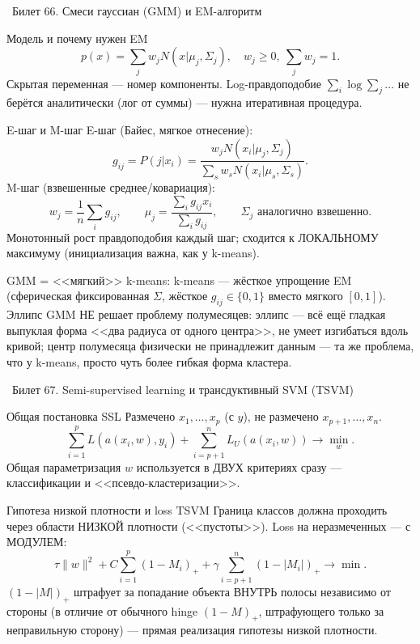 \documentclass[12pt, a4paper]{article}
\newcommand{\bilet}[2]{%
  \vspace{10pt}%
  \noindent\colorbox{qcolor}{\parbox{\dimexpr\linewidth-2\fboxsep\relax}{%
    \color{white}\large\bfseries\strut\ Билет #1. #2%
  }}%
  \nopagebreak\vspace{5pt}\par\nopagebreak%
}
\begin{document}
\bilet{66}{Смеси гауссиан (GMM) и EM-алгоритм}

\begin{defbox}{Модель и почему нужен EM}
\[
  p(x) = \sum_j w_j N(x|\mu_j,\Sigma_j), \quad w_j\ge0,\ \sum_j w_j=1.
\]
Скрытая переменная --- номер компоненты. Log-правдоподобие $\sum_i\log\sum_j\ldots$ не берётся аналитически (лог от суммы) --- нужна итеративная процедура.
\end{defbox}

\begin{proofbox}{E-шаг и M-шаг}
E-шаг (Байес, мягкое отнесение):
\[
  g_{ij} = P(j|x_i) = \frac{w_j N(x_i|\mu_j,\Sigma_j)}{\sum_s w_s N(x_i|\mu_s,\Sigma_s)}.
\]
M-шаг (взвешенные среднее/ковариация):
\[
  w_j=\frac1n\sum_i g_{ij}, \qquad \mu_j = \frac{\sum_i g_{ij}x_i}{\sum_i g_{ij}}, \qquad \Sigma_j \text{ аналогично взвешенно}.
\]
Монотонный рост правдоподобия каждый шаг; сходится к ЛОКАЛЬНОМУ максимуму (инициализация важна, как у k-means).
\end{proofbox}

\begin{fishkabox}
GMM = <<мягкий>> k-means: k-means --- жёсткое упрощение EM (сферическая фиксированная $\Sigma$, жёсткое $g_{ij}\in\{0,1\}$ вместо мягкого $[0,1]$).
Эллипс GMM НЕ решает проблему полумесяцев: эллипс --- всё ещё гладкая выпуклая форма <<два радиуса от одного центра>>, не умеет изгибаться вдоль кривой; центр полумесяца физически не принадлежит данным --- та же проблема, что у k-means, просто чуть более гибкая форма кластера.
\end{fishkabox}

\bilet{67}{Semi-supervised learning и трансдуктивный SVM (TSVM)}

\begin{defbox}{Общая постановка SSL}
Размечено $x_1,\ldots,x_p$ (с $y$), не размечено $x_{p+1},\ldots,x_n$.
\[
  \sum_{i=1}^p L(a(x_i,w),y_i) + \sum_{i=p+1}^n L_U(a(x_i,w)) \to \min_w.
\]
Общая параметризация $w$ используется в ДВУХ критериях сразу --- классификации и <<псевдо-кластеризации>>.
\end{defbox}

\begin{defbox}{Гипотеза низкой плотности и loss TSVM}
Граница классов должна проходить через области НИЗКОЙ плотности (<<пустоты>>). Loss на неразмеченных --- с МОДУЛЕМ:
\[
  \tau\|w\|^2 + C\sum_{i=1}^p(1-M_i)_+ + \gamma\sum_{i=p+1}^n(1-|M_i|)_+ \to \min.
\]
$(1-|M|)_+$ штрафует за попадание объекта ВНУТРЬ полосы независимо от стороны (в отличие от обычного hinge $(1-M)_+$, штрафующего только за неправильную сторону) --- прямая реализация гипотезы низкой плотности.
\end{defbox}
\end{document}
